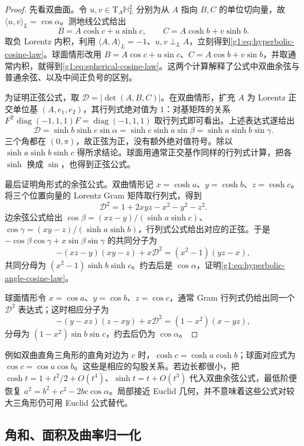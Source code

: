 \begin{proof}
	先看双曲面。令 \(u,v\in \mathrm{T}_A\mathbb H_L^2\) 分别为从 \(A\) 指向 \(B,C\) 的单位切向量，故 \(\langle u,v\rangle_L=\cos\alpha\)。测地线公式给出
	\[
		B=A\cosh c+u\sinh c,\qquad
		C=A\cosh b+v\sinh b.
	\]
	取负 Lorentz 内积，利用 \(\langle A,A\rangle_L=-1\)、\(u,v\perp_L A\)，立刻得到\eqref{g1:eq:hyperbolic-cosine-law}。球面情形改用 \(B=A\cos c+u\sin c\)、\(C=A\cos b+v\sin b\)，并取通常内积，就得到\eqref{g1:eq:spherical-cosine-law}。这两个计算解释了公式中双曲余弦与普通余弦、以及中间正负号的区别。

	为证明正弦公式，取 \(\mathcal D=|\det(A,B,C)|\)。在双曲情形，扩充 \(A\) 为 Lorentz 正交单位基 \((A,e_1,e_2)\)，其行列式绝对值为 \(1\)：对基矩阵的关系 \(F^{\mathsf T}\operatorname{diag}(-1,1,1)F=\operatorname{diag}(-1,1,1)\) 取行列式即可看出。上述表达式遂给出
	\[
		\mathcal D=\sinh b\sinh c\sin\alpha
		=\sinh c\sinh a\sin\beta
		=\sinh a\sinh b\sin\gamma.
	\]
	三个角都在 \((0,\pi)\)，故正弦为正，没有额外绝对值符号。除以 \(\sinh a\sinh b\sinh c\) 得所求结论。球面用通常正交基作同样的行列式计算，把各 \(\sinh\) 换成 \(\sin\)，也得到正弦公式。

	最后证明角形式的余弦公式。双曲情形记 \(x=\cosh a\)、\(y=\cosh b\)、\(z=\cosh c\)。将三个位置向量的 Lorentz Gram 矩阵取行列式，得到
	\[
		\mathcal D^2=1+2xyz-x^2-y^2-z^2.
	\]
	边余弦公式给出 \(\cos\beta=(xz-y)/(\sinh a\sinh c)\)、\(\cos\gamma=(xy-z)/(\sinh a\sinh b)\)，行列式公式给出对应的正弦。于是 \(-\cos\beta\cos\gamma+x\sin\beta\sin\gamma\) 的共同分子为
	\[
		-(xz-y)(xy-z)+x\mathcal D^2=(x^2-1)(yz-x),
	\]
	共同分母为 \((x^2-1)\sinh b\sinh c\)。约去后是 \(\cos\alpha\)，证明\eqref{g1:eq:hyperbolic-angle-cosine-law}。

	球面情形令 \(x=\cos a\)、\(y=\cos b\)、\(z=\cos c\)，通常 Gram 行列式仍给出同一个 \(\mathcal D^2\) 表达式；这时相应分子为
	\[
		-(y-xz)(z-xy)+x\mathcal D^2=(1-x^2)(x-yz),
	\]
	分母为 \((1-x^2)\sin b\sin c\)，约去后仍为 \(\cos\alpha\)。
\end{proof}

例如双曲直角三角形的直角对边为 \(c\) 时，\(\cosh c=\cosh a\cosh b\)；球面对应式为 \(\cos c=\cos a\cos b\)。这些是相应的勾股关系。若边长都很小，把 \(\cosh t=1+t^2/2+O(t^4)\)、\(\sinh t=t+O(t^3)\) 代入双曲余弦公式，最低阶便恢复 \(a^2=b^2+c^2-2bc\cos\alpha\)。局部接近 Euclid 几何，并不意味着这些公式对较大三角形仍可用 Euclid 公式替代。

\subsection{角和、面积及曲率归一化}
\label{g1:subsec:1001:06}

